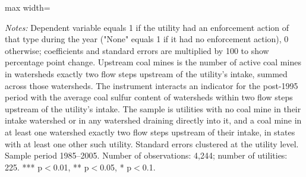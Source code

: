 \begin{table}[htbp]
{\begin{adjustbox}{max width=\linewidth}
\begin{tabular}
\bottomrule
\end{tabular}
\end{adjustbox}
}
\begin{minipage}{\linewidth}
\vspace{4pt}
\footnotesize
\raggedright
\textit{Notes:} Dependent variable equals 1 if the utility had an enforcement action of that type during the year ("None" equals 1 if it had no enforcement action), 0 otherwise; coefficients and standard errors are multiplied by 100 to show percentage point change. Upstream coal mines is the number of active coal mines in watersheds exactly two flow steps upstream of the utility's intake, summed across those watersheds. The instrument interacts an indicator for the post-1995 period with the average coal sulfur content of watersheds within two flow steps upstream of the utility's intake. The sample is utilities with no coal mine in their intake watershed or in any watershed draining directly into it, and a coal mine in at least one watershed exactly two flow steps upstream of their intake, in states with at least one other such utility. Standard errors clustered at the utility level. Sample period 1985--2005. Number of observations: 4,244; number of utilities: 225. *** p$<$0.01, ** p$<$0.05, * p$<$0.1.
\end{minipage}
\end{table}
